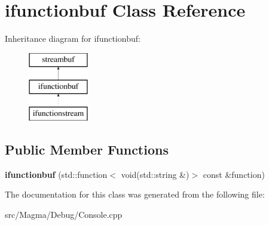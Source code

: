 \hypertarget{classifunctionbuf}{}\section{ifunctionbuf Class Reference}
\label{classifunctionbuf}
Inheritance diagram for ifunctionbuf\+:\begin{figure}[H]
\begin{center}
\leavevmode
\includegraphics[height=3.000000cm]{classifunctionbuf}
\end{center}
\end{figure}
\subsection*{Public Member Functions}
\begin{DoxyCompactItemize}
\item 
\mbox{\label{classifunctionbuf_a6e068a70a5044221e7b3f53b969e02a5}} 
{\bfseries ifunctionbuf} (std\+::function$<$ void(std\+::string \&)$>$ const \&function)
\end{DoxyCompactItemize}


The documentation for this class was generated from the following file\+:\begin{DoxyCompactItemize}
\item 
src/\+Magma/\+Debug/Console.\+cpp\end{DoxyCompactItemize}
